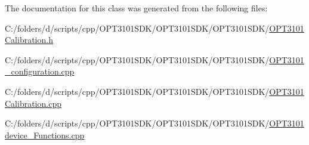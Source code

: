 The documentation for this class was generated from the following files\+:\begin{DoxyCompactItemize}
\item 
C\+:/folders/d/scripts/cpp/\+O\+P\+T3101\+S\+D\+K/\+O\+P\+T3101\+S\+D\+K/\+O\+P\+T3101\+S\+D\+K/\mbox{\hyperlink{_o_p_t3101_calibration_8h}{O\+P\+T3101\+Calibration.\+h}}\item 
C\+:/folders/d/scripts/cpp/\+O\+P\+T3101\+S\+D\+K/\+O\+P\+T3101\+S\+D\+K/\+O\+P\+T3101\+S\+D\+K/\mbox{\hyperlink{_o_p_t3101__configuration_8cpp}{O\+P\+T3101\+\_\+configuration.\+cpp}}\item 
C\+:/folders/d/scripts/cpp/\+O\+P\+T3101\+S\+D\+K/\+O\+P\+T3101\+S\+D\+K/\+O\+P\+T3101\+S\+D\+K/\mbox{\hyperlink{_o_p_t3101_calibration_8cpp}{O\+P\+T3101\+Calibration.\+cpp}}\item 
C\+:/folders/d/scripts/cpp/\+O\+P\+T3101\+S\+D\+K/\+O\+P\+T3101\+S\+D\+K/\+O\+P\+T3101\+S\+D\+K/\mbox{\hyperlink{_o_p_t3101device___functions_8cpp}{O\+P\+T3101device\+\_\+\+Functions.\+cpp}}\end{DoxyCompactItemize}
